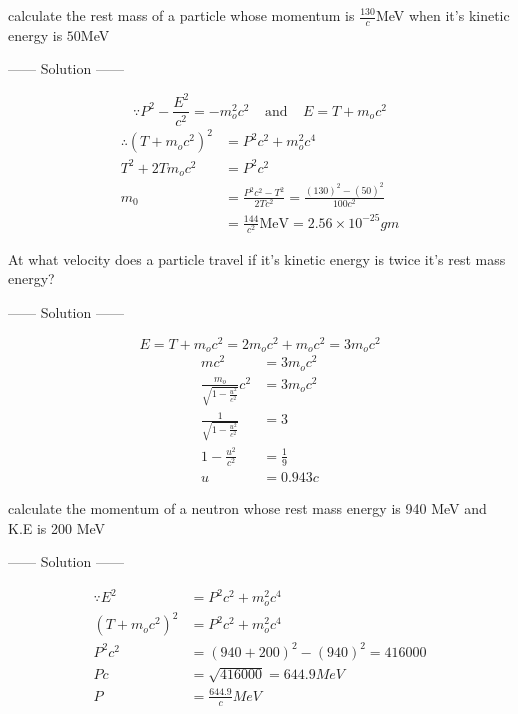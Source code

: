 \documentclass{article}
\begin{document}
\begin{example}
calculate the rest mass of a particle whose momentum is $\frac{130}{c}$MeV when it's kinetic energy is $50$MeV
\begin{center}
    ------ \textcolor{Solution}{Solution} ------
\end{center}
\[
    \because P^2 - \frac{E^2}{c^2} = -m_o^2 c^2 \ \ \ \ \ \text{and} \ \ \ \ \ E = T + m_o c^2
\]
\begin{align*}
\therefore {(T + m_o c^2)}^2 &= P^2c^2 + m_o^2 c^4 \\
            T^2 + 2T m_o c^2 &= P^2c^2\\
            m_0 &= \frac{P^2c^2 - T^2}{2T c^2} = \frac{{(130)}^2 - {(50)}^2}{100 c^2}\\
                &= \frac{144}{c^2} \text{MeV} = 2.56 \times 10^{-25}\si{gm}
\end{align*}
\end{example}
\begin{example}
At what velocity does a particle travel if it's kinetic energy is twice it's rest mass energy?
\begin{center}
    ------ \textcolor{Solution}{Solution} ------
\end{center}
\[
E = T + m_o c^2 = 2 m_o c^2 + m_o c^2  = 3 m_o c^2
\]
\begin{align*}
    m c^2 &= 3 m_o c^2\\
    \frac{m_o}{\sqrt{1 - \frac{u^2}{c^2}}}c^2 &= 3 m_o c^2\\
    \frac{1}{\sqrt{1 - \frac{u^2}{c^2}}} &= 3\\
    1 - \frac{u^2}{c^2} &= \frac{1}{9}\\
    u &= 0.943c
\end{align*}
\end{example}
\begin{example}
calculate the momentum of a neutron whose rest mass energy is 940 MeV and K.E is 200 MeV
\begin{center}
    ------ \textcolor{Solution}{Solution} ------
\end{center}
\begin{align*}
    \because E^2 &= P^2c^2 + m_o^2 c^4 \\    
    {(T + m_o c^2)}^2 &= P^2c^2 + m_o^2 c^4 \\
    P^2c^2 &={(940 + 200)}^2 - {(940)}^2 = 416000\\
    Pc &= \sqrt{416000} = 644.9 \si{MeV}\\
    P &=\frac{644.9}{c} \si{MeV}
\end{align*}
\end{example}
\end{document}

